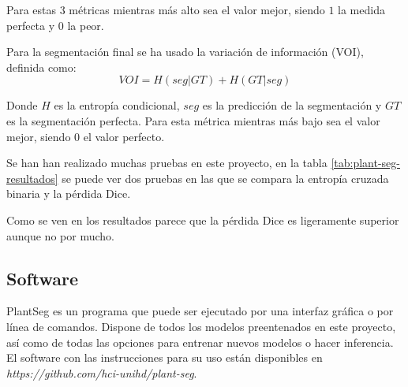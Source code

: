 Para estas 3 métricas mientras más alto sea el valor mejor, siendo $1$ la medida perfecta y $0$ la peor.

Para la segmentación final se ha usado la variación de información (VOI), definida como:
\begin{equation}
VOI = H(seg|GT) + H(GT|seg)
\end{equation}

Donde $H$ es la entropía condicional, $seg$ es la predicción de la segmentación y $GT$ es la segmentación perfecta. Para esta métrica mientras más bajo sea el valor mejor, siendo 0 el valor perfecto.

Se han han realizado muchas pruebas en este proyecto, en la tabla \ref{tab:plant-seg-resultados} se puede ver dos pruebas en las que se compara la entropía cruzada binaria y la pérdida Dice.


Como se ven en los resultados parece que la pérdida Dice es ligeramente superior aunque no por mucho.

\subsection{Software}\label{app2_software}

PlantSeg es un programa que puede ser ejecutado por una interfaz gráfica o por línea de comandos. Dispone de todos los modelos preentenados en este proyecto, así como de todas las opciones para entrenar nuevos modelos o hacer inferencia. El software con las instrucciones para su uso están disponibles en \textit{https://github.com/hci-unihd/plant-seg}.

